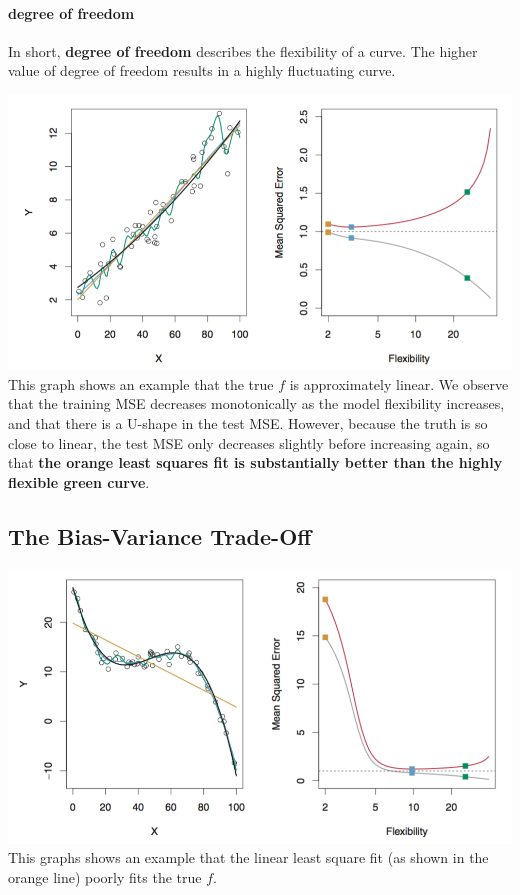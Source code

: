 \documentclass{article}
\begin{document}
\paragraph{degree of freedom}
In short, \textbf{degree of freedom} describes the flexibility of a curve. The higher value of degree of freedom results in a highly fluctuating curve. 

\includegraphics[scale=0.8]{images/flexibility_vs_mse.png} \\
This graph shows an example that the true $f$ is approximately linear. We observe that the training MSE decreases monotonically as the model flexibility increases, and that there is a U-shape in the test MSE. However, because the truth is so close to linear, the test MSE only decreases slightly before increasing again, so that \textbf{the orange least squares fit is substantially better than the highly flexible green curve}.  

\subsection{The Bias-Variance Trade-Off}
\includegraphics[scale=0.8]{images/linear_poorly_fits.png} \\
This graphs shows an example that the linear least square fit (as shown in the orange line) poorly fits the true $f$. 
\end{document}
